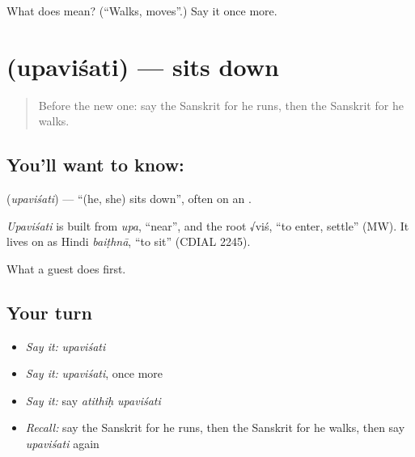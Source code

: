 \begin{tcolorbox}[breakable,colback=teal!4,colframe=teal!35!black,title={Before you move on}]
What does  mean? (\textquotedblleft{}Walks, moves\textquotedblright{}.) Say it once more.
\end{tcolorbox}
\section[\texorpdfstring{\sk{उपविशति} (upaviśati)}{उपविशति (upaviśati)}]{ (upaviśati) — sits down}

\label{lesson:SA-C71-sits}



\begin{quote}
Before the new one: say the Sanskrit for he runs, then the Sanskrit for he walks.
\end{quote}

\subsection*{You'll want to know: }
\textbf{} (\emph{upaviśati}) — \textquotedblleft{}(he, she) sits down\textquotedblright{}, often on an \textbf{}.

\begin{cousinweb}
\emph{Upaviśati} is built from \emph{upa}, \textquotedblleft{}near\textquotedblright{}, and the root √viś, \textquotedblleft{}to enter, settle\textquotedblright{} (MW). It lives on as Hindi \emph{baiṭhnā}, \textquotedblleft{}to sit\textquotedblright{} (CDIAL 2245).
\end{cousinweb}

\begin{grammarlens}[title={What you've built}]
What a guest does first.
\end{grammarlens}

\subsection*{Your turn}
\begin{itemize}
\raggedright
  \item \emph{Say it:} \emph{upaviśati}
  \item \emph{Say it:} \emph{upaviśati}, once more
  \item \emph{Say it:} say \emph{atithiḥ upaviśati}
  \item \emph{Recall:} say the Sanskrit for he runs, then the Sanskrit for he walks, then say \emph{upaviśati} again
\end{itemize}

